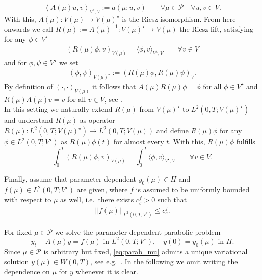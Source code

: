 \documentclass{article}
\theoremstyle{plain}
\theoremstyle{definition}
\theoremstyle{remark}
\begin{document}
\begin{equation}
    \left\langle A(\mu)u, v\right\rangle_{V^{\star}, V} :=  a(\mu; u, v) \qquad \forall \mu \in \mathcal{P} \quad \forall u,v \in V .
\end{equation}
With this, $A(\mu) : V(\mu) \rightarrow V(\mu)^\star$ is the Riesz isomorphism. From here onwards we call $R(\mu) := A(\mu)^{-1} : V(\mu)^\star \rightarrow V(\mu)$ the Riesz lift, satisfying for any $\phi \in V^\star$
\begin{align}
    (R(\mu) \phi,v)_{V(\mu)} =  \langle \phi,v\rangle_{V^\star,V}  \qquad \forall  v \in V
\end{align}
and for $\phi,\psi \in V^\star$ we set
\begin{align}
    (\phi,\psi)_{V(\mu)^\star}:= (R(\mu) \phi, R(\mu) \psi)_{V}. 
\end{align}
By definition of $(\cdot,\cdot)_{V(\mu)}$ it follows that $A(\mu) R(\mu) \phi = \phi$ for all $\phi\in V^\star$ and 
$R(\mu) A(\mu) v = v$ for all $v \in V $, see \cite{Wloka1987,Troeltzsch2010}.\\

In this setting we naturally extend $R(\mu)$ from $V(\mu)^\star$ to $L^2(0,T;V(\mu)^\star)$ and understand $R(\mu)$ as operator $R(\mu) :L^2(0,T;V(\mu)^\star) \to L^2(0,T;V(\mu))$ and define $R(\mu)\phi$ for any $\phi \in L^2(0,T;V^\star)$ as $R(\mu)\phi(t)$ for almost every $t$. With this, $R(\mu)\phi$ fulfills
\begin{equation}
    \int_0^T (R(\mu)\phi, v)_{V(\mu)} = \int_0^T \langle \phi, v \rangle_{V^\star, V} \qquad \forall v \in V .
\end{equation} 


Finally, assume that parameter-dependent $y_0(\mu) \in H$ and $f(\mu) \in L^2(0,T; V^\star)$ are given, where $f$ is assumed to be uniformly bounded  with respect to $\mu$ as well, i.e.~there exists $c_s^f > 0$ such that
\begin{align}\label{eq:cont_of_f}
    \vert\vert f(\mu) \vert\vert_{L^2(0,T;V^\star)} \leq c_s^f.
\end{align}

For fixed $\mu \in \mathcal{P}$ we solve the parameter-dependent parabolic problem
\begin{equation}\label{eq:parab_mu}\tag{$\dagger$}
    y_t + A(\mu)y = f(\mu) \text{ in } L^2(0,T;V^\star), \quad y(0)=y_0(\mu) \text{ in } H.
\end{equation}
Since $\mu \in \mathcal{P}$ is arbitrary but fixed, \eqref{eq:parab_mu} admits a unique variational solution $y(\mu) \in W(0,T)$, see e.g.~\cite{Wloka1987,Thomee2006}. In the following we omit writing the dependence on $\mu$ for $y$ whenever it is clear.
\end{document}
